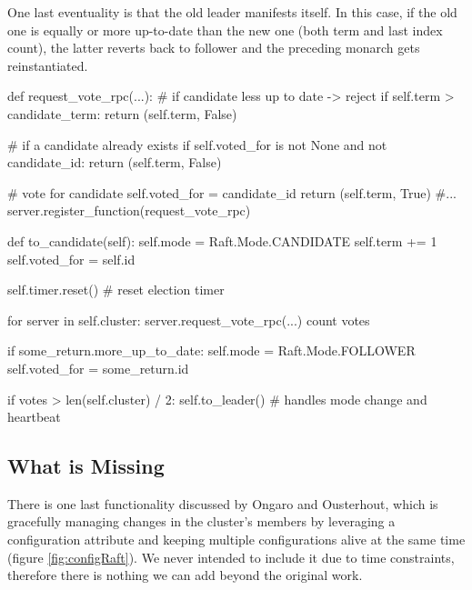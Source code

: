 One last eventuality is that the old leader manifests itself. In this case, if the old one is equally or more up-to-date than the new one (both term and last index count), the latter reverts back to follower and the preceding monarch gets reinstantiated.

\begin{python}[label={code:requestVoteRPC}, caption={Pseudocode for \textit{request\_vote\_rpc}}]
def request_vote_rpc(...):
    # if candidate less up to date -> reject
    if self.term > candidate_term:
        return (self.term, False)

    # if a candidate already exists
    if self.voted_for is not None and not candidate_id:
        return (self.term, False)
    
    # vote for candidate
    self.voted_for = candidate_id
    return (self.term, True)
#...
server.register_function(request_vote_rpc)
\end{python}

\begin{python}[label={code:toCandidate}, caption={Pseudocode for \textit{to\_candidate}, gets fired on \textit{election timer} timeout}]
def to_candidate(self):
    self.mode = Raft.Mode.CANDIDATE
    self.term += 1
    self.voted_for = self.id
    
    self.timer.reset() # reset election timer

    for server in self.cluster:
        server.request_vote_rpc(...)
        count votes
    
    if some_return.more_up_to_date:
        self.mode = Raft.Mode.FOLLOWER
        self.voted_for = some_return.id
    
    if votes > len(self.cluster) / 2:
        self.to_leader()    # handles mode change and heartbeat
\end{python}

\subsection{What is Missing} \label{sec:raftMissing}

There is one last functionality discussed by Ongaro and Ousterhout, which is gracefully managing changes in the cluster's members by leveraging a configuration attribute and keeping multiple configurations alive at the same time (figure \ref{fig:configRaft}). We never intended to include it due to time constraints, therefore there is nothing we can add beyond the original work. 

